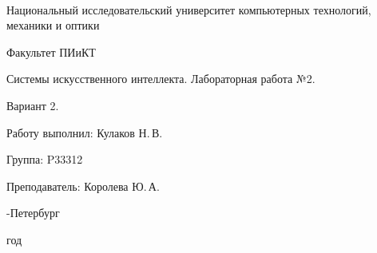 \thispagestyle{empty}

\onecolumn
\begin{center}
	\
\vspace{1 cm}

\huge Национальный исследовательский университет компьютерных технологий, механики и оптики
\vspace{0.5cm}

\Huge Факультет ПИиКТ


\vspace{5cm}
\huge Системы искусственного интеллекта. Лабораторная работа №2.
\vspace{0.2cm}

\LARGE Вариант 2.
\end{center}
\vspace{6 cm}

\begin{flushright}
\Large

Работу выполнил: Кулаков Н.\,В.
\smallskip

Группа: P33312
\smallskip

Преподаватель: Королева Ю.\,А.
\smallskip

\vspace{4cm}
	
-Петербург

 год
\end{flushright}
